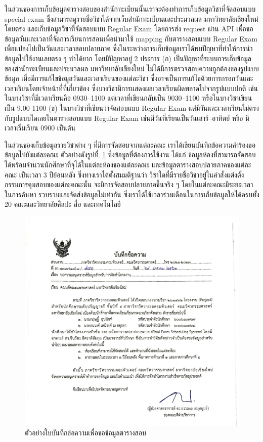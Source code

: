 ในส่วนของการเก็บข้อมูลตารางสอบของสำนักทะเบียนนั้นเราจะต้องทำการเก็บข้อมูลวิชาที่จัดสอบแบบ special exam ซึ่งสามารถดูรายชื่อวิชาได้จากเว็บสำนักทะเบียนและประมวลผล มหาวิทยาลัยเชียงใหม่ โดยตรง
และเก็บข้อมูลวิชาที่จัดสอบแบบ Regular Exam โดยการส่ง request ผ่าน API เพื่อขอข้อมูลวันและเวลาที่จัดการเรียนการสอนเพื่อนำมาใช้ mapping กับตารางสอบแบบ Regular Exam เพื่อแปลงไปเป็นวันและเวลาสอบปลายภาค
ซึ่งในระหว่างการเก็บข้อมูลเราได้พบปัญหาที่ทำให้การนำข้อมูลไปใช้งานเลยตรง ๆ ทำได้ยาก โดยมีปัญหาอยู่ 2 ประการ (ก) เป็นปัญหาที่ระบบการเก็บข้อมูลของสำนักทะเบียนและประมวลผล มหาวิทยาลัยเชียงใหม่ 
ไม่ได้มีการตรวจสอบความถูกต้องของรูปแบบข้อมูล เมื่อมีการแก้ไขข้อมูลวันและเวลาเรียนของแต่ละวิชา ซึ่งอาจเป็นการแก้ไขด้วยการกรอกวันและเวลาเรียนโดยเจ้าหน้าที่ที่เกี่ยวข้อง ซึ่งบางวิชามีการแสดงผลเวลาเรียนผิดพลาดไปจากรูปแบบปกติ
เช่นในบางวิชาที่มีเวลาเรียนคือ 0930--1100 แต่เวลาที่เขียนกลับเป็น 9030--1100 หรือในบางวิชาเขียนเป็น 9.00-1100 (ข) ในบางวิชาที่เขียนว่าจัดสอบแบบ Regular Exam แต่มีวันและเวลาเรียนไม่ตรงกับรูปแบบใดเลยในตารางสอบแบบ Regular Exam
เช่นมีวันที่เรียนเป็นวันเสาร์--อาทิตย์ หรือ มีเวลาเริ่มเรียน 0900 เป็นต้น 


ในส่วนของเก็บข้อมูลรายวิชาต่าง ๆ ที่มีการจัดสอบจากแต่ละคณะ เราได้เขียนบันทึกข้อความคำร้องขอข้อมูลไปยังแต่ละคณะ ตัวอย่างดังรูปที่~\ref{fig:request-memo-scan} 
ซึ่งข้อมูลที่ต้องการใช้งาน ได้แก่ ข้อมูลห้องที่สามารถจัดสอบได้พร้อมจำนวนนักศึกษาที่จุได้ในแต่ละห้องของแต่ละคณะ และข้อมูลตารางสอบปลายภาคของแต่ละคณะ เป็นเวลา 3 ปีย้อนหลัง
ซึ่งทางเราได้ตั้งสมมติฐานว่า วิชาใดที่มีรายชื่อวิชาอยู่ในคำสั่งแต่งตั้งกรรมการคุมสอบของแต่ละคณะนั้น จะมีการจัดสอบปลายภาคขึ้นจริง ๆ โดยในแต่ละคณะมีระยะเวลาในการค้นหา รวบรวมและจัดส่งข้อมูลไม่เท่ากัน
ซึ่งเราได้ใช้เวลาร่วมเดือนในการเก็บข้อมูลให้ได้ครบทั้ง 20 คณะและวิทยาลัยศิลปะ สื่อ และเทคโนโลยี
\begin{figure}
  \begin{center}
    \includegraphics[width=0.65\linewidth]{images/request_memo_scan_crop.png}
  \end{center}
  \caption[ตัวอย่างใบบันทึกข้อความเพื่อขอข้อมูลตารางสอบ]{ตัวอย่างใบบันทึกข้อความเพื่อขอข้อมูลตารางสอบ}
  \label{fig:request-memo-scan}     
\end{figure}

